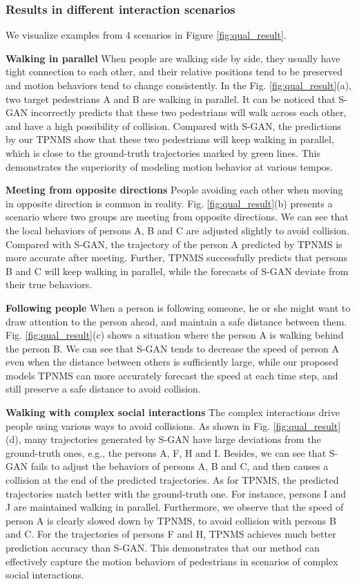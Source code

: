 \documentclass[letterpaper]{article} \usepackage{aaai21}  \usepackage{times}  \usepackage{helvet} \usepackage{courier}  \usepackage[hyphens]{url}  \usepackage{graphicx} \urlstyle{rm} \def\UrlFont{\rm}  \usepackage{natbib}  \usepackage{caption} \frenchspacing  \setlength{\pdfpagewidth}{8.5in}  \setlength{\pdfpageheight}{11in}
\begin{document}
\subsubsection{Results in different interaction scenarios}
We visualize examples from 4 scenarios in Figure \ref{fig:qual_result}.


\textbf{Walking in parallel } When people are walking side by side, they usually have tight connection to each other, and their relative positions tend to be preserved and motion behaviors tend to change consistently. In the Fig. \ref{fig:qual_result}(a), two target pedestrians A and B are walking in parallel.
It can be noticed that S-GAN incorrectly predicts that these two pedestrians will walk across each other, and have a high possibility of collision. 
Compared with S-GAN, the predictions by our TPNMS show that these two pedestrians will keep walking in parallel, which is close to the ground-truth trajectories marked by green lines.
This demonstrates the superiority of modeling motion behavior at various tempos.


\textbf{Meeting from opposite directions} People avoiding each other when moving in opposite direction is common in reality. Fig. \ref{fig:qual_result}(b) presents a scenario where two groups are meeting from opposite directions. We can see that the local behaviors of persons A, B and C are adjusted slightly to avoid collision. Compared with S-GAN, the trajectory of the person A predicted by TPNMS is more accurate after meeting. Further, TPNMS successfully predicts that persons B and C will keep walking in parallel, while the forecasts of S-GAN deviate from their true behaviors.


\textbf{Following people} When a person is following someone, he or she might want to draw attention to the person ahead, and maintain a safe distance between them. Fig. \ref{fig:qual_result}(c) shows a situation where the person A is walking behind the person B. We can see that S-GAN tends to decrease the speed of person A even when the distance between others is sufficiently large, while our proposed models TPNMS can more accurately forecast the speed at each time step, and still preserve a safe distance to avoid collision.


\textbf{Walking with complex social interactions} 
The complex interactions drive people using various ways to avoid collisions. As shown in Fig. \ref{fig:qual_result}(d),  many trajectories generated by S-GAN have large deviations from the ground-truth ones, e.g., the persons A, F, H and I. Besides, we can see that S-GAN fails to adjust the behaviors of persons A, B and C, and then causes a collision at the end of the predicted trajectories.  As for TPNMS, the predicted trajectories match better with the ground-truth one. For instance, persons I and J are maintained walking in parallel. Furthermore, we observe that the speed of person A is clearly slowed down by TPNMS, to avoid collision with persons B and C. For the trajectories of persons F and H, TPNMS achieves much better prediction accuracy than S-GAN. This demonstrates that our method can effectively capture the motion behaviors of pedestrians in scenarios of complex social interactions. 
\end{document}
